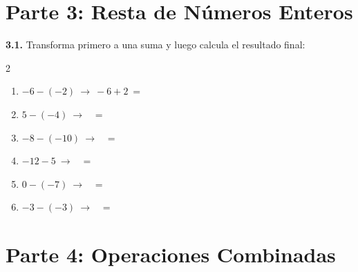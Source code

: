 \documentclass[11pt, letterpaper]{article}
\newif\ifshowanswers
\newcommand{\answer}[1]{
	\ifshowanswers
	\par\vspace{0.1cm}
	\begin{tcolorbox}[colback=blue!5!white, colframe=blue!60!white, arc=1mm, boxrule=0.5pt, title=\textbf{\footnotesize SOLUCIÓN PASO A PASO (DOCENTE)}]
		\color{blue!80!black}\footnotesize #1
	\end{tcolorbox}
	\par\vspace{0.1cm}
	\else
	\par\vspace{0.2cm}
	\fi
}
\begin{document}
	\section*{\color{valblue} Parte 3: Resta de Números Enteros}
	
	\noindent \textbf{3.1.} Transforma primero a una suma y luego calcula el resultado final:
	\begin{multicols}{2}
		\begin{enumerate}[label=\alph*), itemsep=0.1cm]
			\item $-6 - (-2) \ \rightarrow \ -6 + 2 \ = \ $ \underline{\hspace{1cm}}
			\item $5 - (-4) \ \rightarrow \ $ \underline{\hspace{2cm}} $ \ = \ $ \underline{\hspace{1cm}}
			\item $-8 - (-10) \ \rightarrow \ $ \underline{\hspace{2cm}} $ \ = \ $ \underline{\hspace{1cm}}
			\item $-12 - 5 \ \rightarrow \ $ \underline{\hspace{2cm}} $ \ = \ $ \underline{\hspace{1cm}}
			\item $0 - (-7) \ \rightarrow \ $ \underline{\hspace{2cm}} $ \ = \ $ \underline{\hspace{1cm}}
			\item $-3 - (-3) \ \rightarrow \ $ \underline{\hspace{2cm}} $ \ = \ $ \underline{\hspace{1cm}}
		\end{enumerate}
	\end{multicols}
	
	\answer{
		a) $-6 + 2 = \mathbf{-4}$ \quad
		b) $5 + 4 = \mathbf{9}$ \quad
		c) $-8 + 10 = \mathbf{2}$ \quad
		d) $-12 + (-5) = \mathbf{-17}$ \quad
		e) $0 + 7 = \mathbf{7}$ \quad
		f) $-3 + 3 = \mathbf{0}$
	}
	
	\section*{\color{valblue} Parte 4: Operaciones Combinadas}
	
\end{document}
